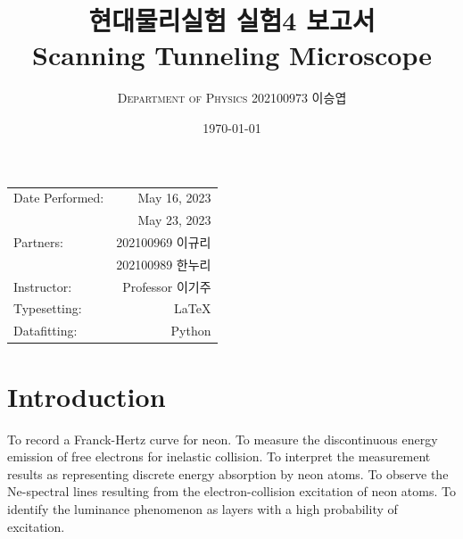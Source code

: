 \documentclass[a4paper, 10pt, nanum]{CSUniSchoolLabReport}
\title{현대물리실험 실험4 보고서 \\ Scanning Tunneling Microscope} %
\author{\textsc{Department of Physics} 202100973 이승엽}
\date{\today}
\begin{document}
\maketitle %

\begin{center}
	\begin{tabular}{l r}
		Date Performed: & May 16, 2023 \\ %
		& May 23, 2023 \\
		Partners: & 202100969 이규리 \\ %
		& 202100989 한누리 \\
		Instructor: & Professor 이기주 \\ %
		Typesetting: & LaTeX \\
		Datafitting: & Python \\
	\end{tabular}
\end{center}


\maketitle


\section{Introduction}

  To record a Franck-Hertz curve for neon. To measure the discontinuous energy emission of free electrons for inelastic collision. To interpret the measurement results as representing discrete energy absorption by neon atoms. To observe the Ne-spectral lines resulting from the electron-collision excitation of neon atoms. To identify the luminance phenomenon as layers with a high probability of excitation. 
\end{document}
